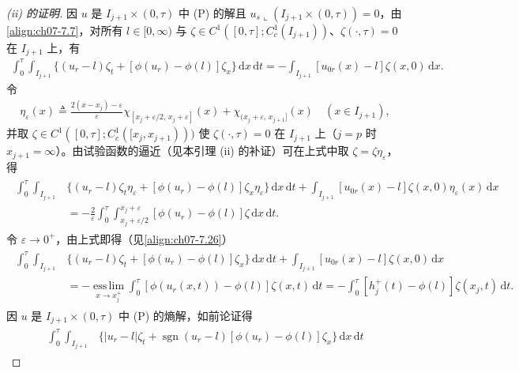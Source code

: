 \documentclass[../../main.tex]{subfiles}%
\begin{document}
\begin{proof}[(ii) 的证明]
因 $u$ 是 $I_{j+1}\times(0,\tau)$ 中 (P) 的解且 $u_s\llcorner(I_{j+1}\times(0,\tau))=0$，由\eqref{align:ch07-7.7}，对所有 $l\in[0,\infty)$ 与 $\zeta\in C^1([0,\tau];C^1_c(I_{j+1}))$、$\zeta(\cdot,\tau)=0$ 在 $I_{j+1}$ 上，有
\begin{align*}
\int_0^\tau\int_{I_{j+1}}\{(u_r-l)\zeta_t+[\phi(u_r)-\phi(l)]\zeta_x\}\,\mathrm{d}x\,\mathrm{d}t
=-\int_{I_{j+1}}[u_{0r}(x)-l]\zeta(x,0)\,\mathrm{d}x.
\end{align*}
令
\begin{align}
\eta_\varepsilon(x)\triangleq \frac{2(x-x_j)-\varepsilon}{\varepsilon}\chi_{[x_j+\varepsilon/2,\,x_j+\varepsilon]}(x)+\chi_{(x_j+\varepsilon,\,x_{j+1}]}(x)
\quad(x\in I_{j+1}), \label{align:ch07-7.27}
\end{align}
并取 $\zeta\in C^1([0,\tau];C^1_c([x_j,x_{j+1})))$ 使 $\zeta(\cdot,\tau)=0$ 在 $I_{j+1}$ 上（$j=p$ 时 $x_{j+1}=\infty$）。由试验函数的逼近（见本引理 (ii) 的补证）可在上式中取 $\zeta=\zeta\eta_\varepsilon$，得
\begin{align*}
\begin{aligned}
\int_0^\tau\int_{I_{j+1}}&\{(u_r-l)\zeta_t\eta_\varepsilon+[\phi(u_r)-\phi(l)]\zeta_x\eta_\varepsilon\}\,\mathrm{d}x\,\mathrm{d}t
+\int_{I_{j+1}}[u_{0r}(x)-l]\zeta(x,0)\eta_\varepsilon(x)\,\mathrm{d}x\\
&=-\frac{2}{\varepsilon}\int_0^\tau\int_{x_j+\varepsilon/2}^{x_j+\varepsilon}[\phi(u_r)-\phi(l)]\zeta\,\mathrm{d}x\,\mathrm{d}t.
\end{aligned}
\end{align*}
令 $\varepsilon\to0^+$，由上式即得（见\eqref{align:ch07-7.26}）
\begin{align}
\begin{aligned}
\int_0^\tau\int_{I_{j+1}}&\{(u_r-l)\zeta_t+[\phi(u_r)-\phi(l)]\zeta_x\}\,\mathrm{d}x\,\mathrm{d}t
+\int_{I_{j+1}}[u_{0r}(x)-l]\zeta(x,0)\,\mathrm{d}x\\
&=-\operatorname*{ess\,lim}_{x\to x_j^+}\int_0^\tau[\phi(u_r(x,t))-\phi(l)]\zeta(x,t)\,\mathrm{d}t
=-\int_0^\tau[h_j^+(t)-\phi(l)]\zeta(x_j,t)\,\mathrm{d}t.
\end{aligned} 
\label{align:ch07-7.28}
\end{align}
因 $u$ 是 $I_{j+1}\times(0,\tau)$ 中 (P) 的熵解，如前论证得
\begin{align*}
\begin{aligned}
\int_0^\tau\int_{I_{j+1}}&\{|u_r-l|\zeta_t+\operatorname{sgn}(u_r-l)[\phi(u_r)-\phi(l)]\zeta_x\}\,\mathrm{d}x\,\mathrm{d}t

\end{aligned}
\end{align*}
\end{proof}
\end{document}
